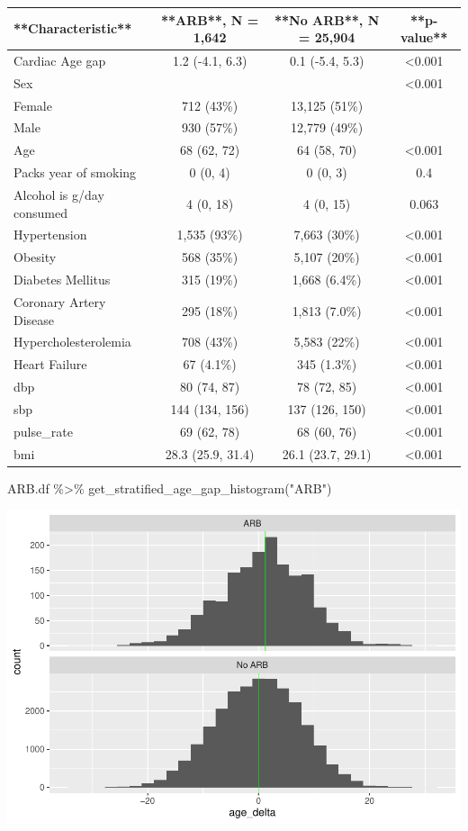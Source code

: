 \documentclass[
]{article}
\newenvironment{Shaded}{\begin{snugshade}}{\end{snugshade}}
\newcommand{\FunctionTok}[1]{\textcolor[rgb]{0.00,0.00,0.00}{#1}}
\newcommand{\NormalTok}[1]{#1}
\newcommand{\SpecialCharTok}[1]{\textcolor[rgb]{0.00,0.00,0.00}{#1}}
\newcommand{\StringTok}[1]{\textcolor[rgb]{0.31,0.60,0.02}{#1}}
\begin{document}
\begin{tabular}{l|c|c|c}
\hline
**Characteristic** & **ARB**, N = 1,642 & **No ARB**, N = 25,904 & **p-value**\\
\hline
Cardiac Age gap & 1.2 (-4.1, 6.3) & 0.1 (-5.4, 5.3) & <0.001\\
\hline
Sex &  &  & <0.001\\
\hline
Female & 712 (43\%) & 13,125 (51\%) & \\
\hline
Male & 930 (57\%) & 12,779 (49\%) & \\
\hline
Age & 68 (62, 72) & 64 (58, 70) & <0.001\\
\hline
Packs year of smoking & 0 (0, 4) & 0 (0, 3) & 0.4\\
\hline
Alcohol is g/day consumed & 4 (0, 18) & 4 (0, 15) & 0.063\\
\hline
Hypertension & 1,535 (93\%) & 7,663 (30\%) & <0.001\\
\hline
Obesity & 568 (35\%) & 5,107 (20\%) & <0.001\\
\hline
Diabetes Mellitus & 315 (19\%) & 1,668 (6.4\%) & <0.001\\
\hline
Coronary Artery Disease & 295 (18\%) & 1,813 (7.0\%) & <0.001\\
\hline
Hypercholesterolemia & 708 (43\%) & 5,583 (22\%) & <0.001\\
\hline
Heart Failure & 67 (4.1\%) & 345 (1.3\%) & <0.001\\
\hline
dbp & 80 (74, 87) & 78 (72, 85) & <0.001\\
\hline
sbp & 144 (134, 156) & 137 (126, 150) & <0.001\\
\hline
pulse\_rate & 69 (62, 78) & 68 (60, 76) & <0.001\\
\hline
bmi & 28.3 (25.9, 31.4) & 26.1 (23.7, 29.1) & <0.001\\
\hline
\end{tabular}

\begin{Shaded}
\begin{Highlighting}[]
\NormalTok{ARB.df }\SpecialCharTok{\%\textgreater{}\%} 
  \FunctionTok{get\_stratified\_age\_gap\_histogram}\NormalTok{(}\StringTok{"ARB"}\NormalTok{)}
\end{Highlighting}
\end{Shaded}

\includegraphics{../results/report_files/figure-latex/ARB-age-gap-histograms-1.pdf}
\end{document}
